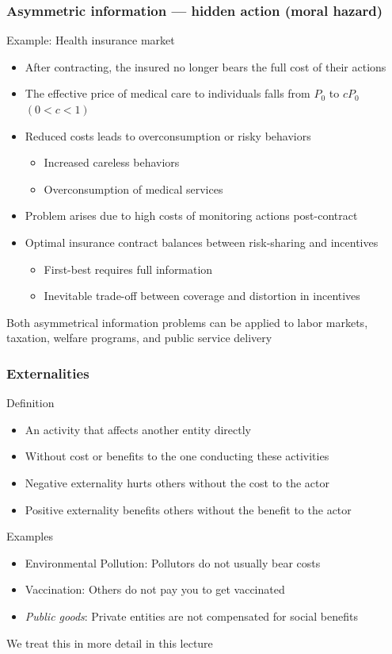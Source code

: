 \documentclass[aspectratio=169]{beamer}
\begin{document}
\begin{frame}
\frametitle{Asymmetric information --- hidden action (moral hazard)}
Example: Health insurance market
\begin{itemize}\setlength\itemsep{3pt}
    \item After contracting, the insured no longer bears the full cost of their actions 
    \item The effective price of medical care to individuals falls from $P_0$ to $cP_0$ $(0<c < 1)$
    \item Reduced costs leads to overconsumption or risky behaviors
    \begin{itemize}\setlength\itemsep{3pt}
      \item Increased careless behaviors
      \item Overconsumption of medical services
    \end{itemize}
    
    \item Problem arises due to high costs of monitoring actions post-contract
         \item Optimal insurance contract balances between risk-sharing and incentives
         \begin{itemize}\setlength\itemsep{3pt}
          \item First-best requires full information
          \item Inevitable trade-off between coverage and distortion in incentives
         \end{itemize}

\end{itemize}\bigskip
Both asymmetrical information problems can be applied to  labor markets, taxation, welfare programs, and public service delivery
\end{frame}



\begin{frame}
\frametitle{Externalities} 
Definition
\begin{itemize}\setlength\itemsep{3pt}
\item An activity that affects another entity directly
\item Without cost or benefits to the one conducting these activities 
\item Negative externality hurts others without the cost to the actor
\item Positive externality benefits others without the benefit to the actor
\end{itemize}\medskip
Examples 
\begin{itemize}\setlength\itemsep{3pt}
\item Environmental Pollution: Pollutors do not usually bear costs
\item Vaccination: Others do not pay you to get vaccinated
\item \textit{Public goods}: Private entities are not compensated for social benefits
\end{itemize}\medskip
We treat this in more detail in this lecture
\end{frame}
\end{document}
